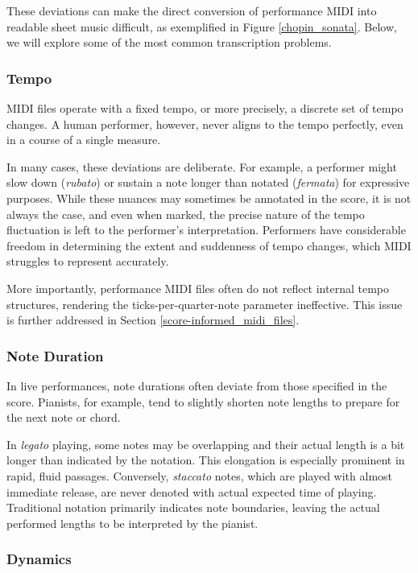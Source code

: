 These deviations can make the direct conversion of performance MIDI into readable sheet music difficult, as exemplified in Figure \ref{chopin_sonata}. Below, we will explore some of the most common transcription problems.

\subsubsection{Tempo}

MIDI files operate with a fixed tempo, or more precisely, a discrete set of tempo changes. A human performer, however, never aligns to the tempo perfectly, even in a course of a single measure.

In many cases, these deviations are deliberate. For example, a performer might slow down (\emph{rubato}) or sustain a note longer than notated (\emph{fermata}) for expressive purposes. While these nuances may sometimes be annotated in the score, it is not always the case, and even when marked, the precise nature of the tempo fluctuation is left to the performer’s interpretation. Performers have considerable freedom in determining the extent and suddenness of tempo changes, which MIDI struggles to represent accurately.

More importantly, performance MIDI files often do not reflect internal tempo structures, rendering the ticks-per-quarter-note parameter ineffective. This issue is further addressed in Section \ref{score-informed_midi_files}.

\subsubsection{Note Duration}

In live performances, note durations often deviate from those specified in the score. Pianists, for example, tend to slightly shorten note lengths to prepare for the next note or chord.

In \emph{legato} playing, some notes may be overlapping and their actual length is a bit longer than indicated by the notation. This elongation is especially prominent in rapid, fluid passages. Conversely, \emph{staccato} notes, which are played with almost immediate release, are never denoted with actual expected time of playing. Traditional notation primarily indicates note boundaries, leaving the actual performed lengths to be interpreted by the pianist.

\subsubsection{Dynamics}

